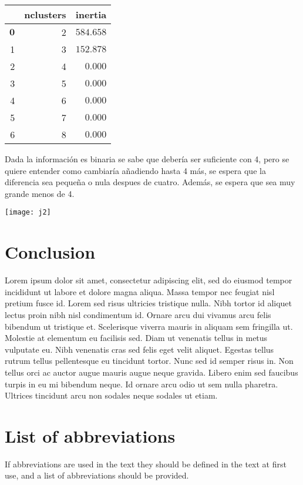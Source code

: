 \documentclass[twocolumn]{bmcart}%
\begin{document}
\begin{tabular}{rrr} 
& nclusters & inertia \\
\hline $\mathbf{0}$ & 2 & $584.658$ \\
1 & 3 & $152.878$ \\
2 & 4 & $0.000$ \\
3 & 5 & $0.000$ \\
4 & 6 & $0.000$ \\
5 & 7 & $0.000$ \\
6 & 8 & $0.000$
\end{tabular}

Dada la información es binaria se sabe que debería ser suficiente con 4, pero se quiere entender como cambiaría añadiendo hasta 4 más, se espera que la diferencia sea pequeña o nula despues de cuatro. Además, se espera que sea muy grande menos de 4. 

\texttt{[image: j2]}



\section*{Conclusion}
Lorem ipsum dolor sit amet, consectetur adipiscing elit, sed do eiusmod tempor incididunt ut labore et dolore magna aliqua. Massa tempor nec feugiat nisl pretium fusce id. Lorem sed risus ultricies tristique nulla. Nibh tortor id aliquet lectus proin nibh nisl condimentum id. Ornare arcu dui vivamus arcu felis bibendum ut tristique et. Scelerisque viverra mauris in aliquam sem fringilla ut. Molestie at elementum eu facilisis sed. Diam ut venenatis tellus in metus vulputate eu. Nibh venenatis cras sed felis eget velit aliquet. Egestas tellus rutrum tellus pellentesque eu tincidunt tortor. Nunc sed id semper risus in. Non tellus orci ac auctor augue mauris augue neque gravida. Libero enim sed faucibus turpis in eu mi bibendum neque. Id ornare arcu odio ut sem nulla pharetra. Ultrices tincidunt arcu non sodales neque sodales ut etiam.

\section*{List of abbreviations}
If abbreviations are used in the text they should be defined in the text at first use, and a list of abbreviations should be provided.







\end{document}
